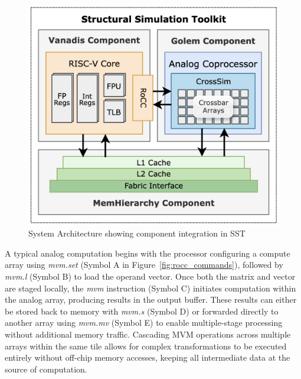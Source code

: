 \begin{figure}[ht]
    \centering
    \includegraphics[scale=0.30]{figures/arch_detailed.png}
    \caption{System Architecture showing component integration in SST}
    \label{fig:architecture}
\end{figure}


A typical analog computation begins with the processor configuring a compute array using \textit{mvm.set} (Symbol A in Figure~\ref{fig:rocc_commands}), followed by \textit{mvm.l} (Symbol B) to load the operand vector.
Once both the matrix and vector are staged locally, the \textit{mvm} instruction (Symbol C) initiates computation within the analog array, producing results in the output buffer.
These results can either be stored back to memory with \textit{mvm.s} (Symbol D) or forwarded directly to another array using \textit{mvm.mv} (Symbol E) to enable multiple-stage processing without additional memory traffic.
Cascading MVM operations across multiple arrays within the same tile allows for complex transformations to be executed entirely without off-chip memory accesses, keeping all intermediate data at the source of computation.




